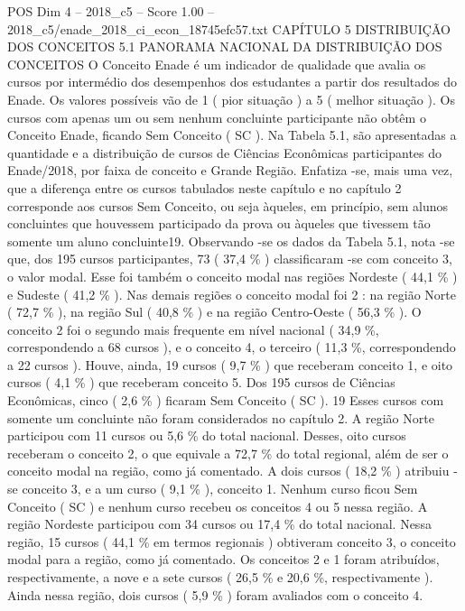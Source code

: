 \begin{textsample}{POS Dim 4 – 2018\_c5 – Score 1.00 – 2018\_c5/enade\_2018\_ci\_econ\_18745efc57.txt}  \label{ex:f4_pos_220}
CAPÍTULO 5 DISTRIBUIÇÃO DOS CONCEITOS 5.1 PANORAMA NACIONAL DA DISTRIBUIÇÃO DOS CONCEITOS O Conceito Enade é um indicador de qualidade que avalia os cursos por intermédio dos desempenhos dos estudantes a partir dos resultados do Enade.
Os valores possíveis vão de 1 ( pior situação ) a 5 ( melhor situação ).
Os cursos com apenas um ou sem nenhum concluinte participante não obtêm o Conceito Enade, ficando Sem Conceito ( SC ).
Na Tabela 5.1, são apresentadas a quantidade e a distribuição de cursos de Ciências Econômicas participantes do Enade/2018, por faixa de conceito e Grande Região.
Enfatiza -se, mais uma vez, que a diferença entre os cursos tabulados neste capítulo e no capítulo 2 corresponde aos cursos Sem Conceito, ou seja àqueles, em princípio, sem alunos concluintes que houvessem participado da prova ou àqueles que tivessem tão somente um aluno concluinte19.
Observando -se os dados da Tabela 5.1, nota -se que, dos 195 cursos participantes, 73 ( 37,4 \% ) classificaram -se com conceito 3, o valor modal.
Esse foi também o conceito modal nas regiões Nordeste ( 44,1 \% ) e Sudeste ( 41,2 \% ).
Nas demais regiões o conceito modal foi 2 : na região Norte ( 72,7 \% ), na região Sul ( 40,8 \% ) e na região Centro-Oeste ( 56,3 \% ).
O conceito 2 foi o segundo mais frequente em nível nacional ( 34,9 \%, correspondendo a 68 cursos ), e o conceito 4, o terceiro ( 11,3 \%, correspondendo a 22 cursos ).
Houve, ainda, 19 cursos ( 9,7 \% ) que receberam conceito 1, e oito cursos ( 4,1 \% ) que receberam conceito 5.
Dos 195 cursos de Ciências Econômicas, cinco ( 2,6 \% ) ficaram Sem Conceito ( SC ). 19 Esses cursos com somente um concluinte não foram considerados no capítulo 2.
A região Norte participou com 11 cursos ou 5,6 \% do total nacional.
Desses, oito cursos receberam o conceito 2, o que equivale a 72,7 \% do total regional, além de ser o conceito modal na região, como já comentado.
A dois cursos ( 18,2 \% ) atribuiu -se conceito 3, e a um curso ( 9,1 \% ), conceito 1.
Nenhum curso ficou Sem Conceito ( SC ) e nenhum curso recebeu os conceitos 4 ou 5 nessa região.
A região Nordeste participou com 34 cursos ou 17,4 \% do total nacional.
Nessa região, 15 cursos ( 44,1 \% em termos regionais ) obtiveram conceito 3, o conceito modal para a região, como já comentado.
Os conceitos 2 e 1 foram atribuídos, respectivamente, a nove e a sete cursos ( 26,5 \% e 20,6 \%, respectivamente ).
Ainda nessa região, dois cursos ( 5,9 \% ) foram avaliados com o conceito 4.

\end{textsample}

